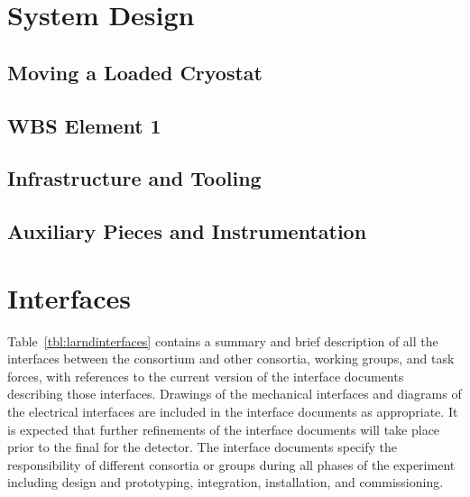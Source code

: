 \section{System Design}
\label{sec:prism-des}

\subsection{Moving a Loaded Cryostat}
\label{sec:prism-des-move}


\subsection{WBS Element 1}
\label{sec:prism-des-wbs1}

\subsection{Infrastructure and Tooling}
\label{sec:prism-des-infr}

\subsection{Auxiliary Pieces and Instrumentation}
\label{sec:prism-des-aux}

\section{Interfaces}
\label{sec:prism-interface}

Table~\ref{tbl:larndinterfaces} contains a summary and brief description of all the interfaces between the  consortium and other consortia, working groups, and task forces, with references to the current version of the interface documents describing those interfaces.  
Drawings of the mechanical interfaces and diagrams of the electrical interfaces are 
included in the interface documents as appropriate.
It is expected that further refinements of the interface documents will take place prior to the final  for the detector. The interface documents specify the responsibility of different consortia or groups during all phases of the experiment including design and prototyping, integration,  installation, and  commissioning.



